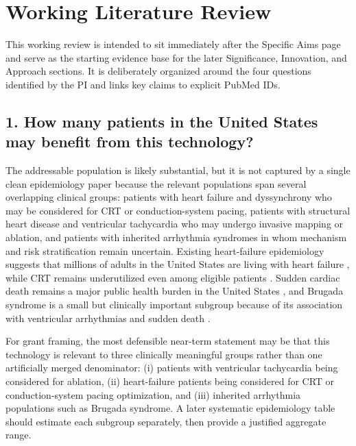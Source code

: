 \newpage
\section*{Working Literature Review}

This working review is intended to sit immediately after the Specific Aims page and serve as the starting evidence base for the later Significance, Innovation, and Approach sections. It is deliberately organized around the four questions identified by the PI and links key claims to explicit PubMed IDs.

\subsection*{1. How many patients in the United States may benefit from this technology?}

The addressable population is likely substantial, but it is not captured by a single clean epidemiology paper because the relevant populations span several overlapping clinical groups: patients with heart failure and dyssynchrony who may be considered for CRT or conduction-system pacing, patients with structural heart disease and ventricular tachycardia who may undergo invasive mapping or ablation, and patients with inherited arrhythmia syndromes in whom mechanism and risk stratification remain uncertain. Existing heart-failure epidemiology suggests that millions of adults in the United States are living with heart failure \cite{pmid29173412,pmid22227365}, while CRT remains underutilized even among eligible patients \cite{pmid24948569}. Sudden cardiac death remains a major public health burden in the United States \cite{pmid25813838}, and Brugada syndrome is a small but clinically important subgroup because of its association with ventricular arrhythmias and sudden death \cite{pmid31586529,pmid31993492}.

For grant framing, the most defensible near-term statement may be that this technology is relevant to three clinically meaningful groups rather than one artificially merged denominator: (i) patients with ventricular tachycardia being considered for ablation, (ii) heart-failure patients being considered for CRT or conduction-system pacing optimization, and (iii) inherited arrhythmia populations such as Brugada syndrome. A later systematic epidemiology table should estimate each subgroup separately, then provide a justified aggregate range.

